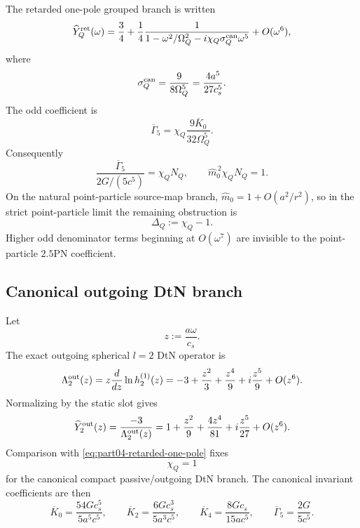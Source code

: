 The retarded one-pole grouped branch is written
\begin{equation}
\label{eq:part04-retarded-one-pole}
\widehat Y_Q^{\rm ret}(\omega)
=
\frac34+\frac14
\frac{1}{1-\omega^2/\Omega_Q^2-i\chi_Q\sigma_Q^{\rm can}\omega^5}
+O(\omega^6),
\end{equation}
where
\begin{equation}
\label{eq:part04-sigmaQcan}
\sigma_Q^{\rm can}=\frac{9}{8\Omega_Q^5}=\frac{4a^5}{27c_s^5}.
\end{equation}
The odd coefficient is
\begin{equation}
\label{eq:part04-gamma5-chiN}
\overline\Gamma_5
=\chi_Q\frac{9\overline K_0}{32\Omega_Q^5}.
\end{equation}
Consequently
\begin{equation}
\label{eq:part04-factorized-defect-again}
\frac{\overline\Gamma_5}{2G/(5c^5)}=\chi_Q N_Q,
\qquad
\widehat m_0^{\,2}\chi_Q N_Q=1.
\end{equation}
On the natural point-particle source-map branch, \(\widehat m_0=1+O(a^2/r^2)\), so in the strict point-particle limit the remaining obstruction is
\begin{equation}
\label{eq:part04-DeltaQ-def}
\Delta_Q:=\chi_Q-1.
\end{equation}
Higher odd denominator terms beginning at \(O(\omega^7)\) are invisible to the point-particle \(2.5\)PN coefficient.

\subsection{Canonical outgoing DtN branch}
\label{subsec:part04-canonical-dtn}

Let
\begin{equation}
\label{eq:part04-z-def}
z:=\frac{a\omega}{c_s}.
\end{equation}
The exact outgoing spherical \(l=2\) DtN operator is
\begin{equation}
\label{eq:part04-Lambda-out-dtn}
\Lambda_2^{\rm out}(z)
=
z\frac{d}{dz}\ln h_2^{(1)}(z)
=
-3+\frac{z^2}{3}+\frac{z^4}{9}+i\frac{z^5}{9}+O(z^6).
\end{equation}
Normalizing by the static slot gives
\begin{equation}
\label{eq:part04-Yout-dtn}
\widehat Y_2^{\rm out}(z)
=
\frac{-3}{\Lambda_2^{\rm out}(z)}
=
1+\frac{z^2}{9}+\frac{4z^4}{81}+i\frac{z^5}{27}+O(z^6).
\end{equation}
Comparison with \eqref{eq:part04-retarded-one-pole} fixes
\begin{equation}
\label{eq:part04-chiQ-equals-one}
\chi_Q=1
\end{equation}
for the canonical compact passive/outgoing DtN branch.  The canonical invariant coefficients are then
\begin{equation}
\label{eq:part04-canonical-invariant-coeffs}
\overline K_0=\frac{54Gc_s^5}{5a^5c^5},
\qquad
\overline K_2=\frac{6Gc_s^3}{5a^3c^5},
\qquad
\overline K_4=\frac{8Gc_s}{15ac^5},
\qquad
\overline\Gamma_5=\frac{2G}{5c^5}.
\end{equation}

